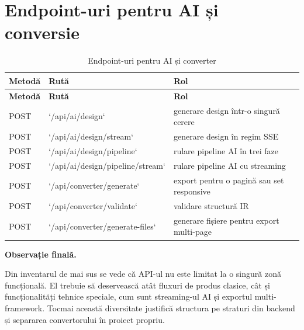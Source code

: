 \section{Endpoint-uri pentru AI și conversie}

\begin{longtable}{>{\RaggedRight\arraybackslash}p{2cm}>{\RaggedRight\arraybackslash}p{5.7cm}>{\RaggedRight\arraybackslash}p{6.2cm}}
  \caption{Endpoint-uri pentru AI și converter} \\
  \toprule
  \textbf{Metodă} & \textbf{Rută} & \textbf{Rol} \\
  \midrule
  \endfirsthead
  \toprule
  \textbf{Metodă} & \textbf{Rută} & \textbf{Rol} \\
  \midrule
  \endhead
  POST & `/api/ai/design` & generare design într-o singură cerere \\
  POST & `/api/ai/design/stream` & generare design în regim SSE \\
  POST & `/api/ai/design/pipeline` & rulare pipeline AI în trei faze \\
  POST & `/api/ai/design/pipeline/stream` & rulare pipeline AI cu streaming \\
  POST & `/api/converter/generate` & export pentru o pagină sau set responsive \\
  POST & `/api/converter/validate` & validare structură IR \\
  POST & `/api/converter/generate-files` & generare fișiere pentru export multi-page \\
  \bottomrule
\end{longtable}

\noindent\textbf{Observație finală.}

Din inventarul de mai sus se vede că API-ul nu este limitat la o singură zonă funcțională. El trebuie să deservească atât fluxuri de produs clasice, cât și funcționalități tehnice speciale, cum sunt streaming-ul AI și exportul multi-framework. Tocmai această diversitate justifică structura pe straturi din backend și separarea convertorului în proiect propriu.
